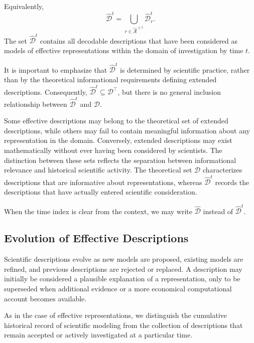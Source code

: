 Equivalently,
\[
\hat{\mathcal{D}}^t = \bigcup_{r\in\hat{\mathcal{R}}^{\leq t}} \hat{\mathcal{D}}_r^t.
\]
The set $\hat{\mathcal{D}}^t$ contains all decodable descriptions that have been considered as models of effective representations within the domain of investigation by time $t$.

It is important to emphasize that $\hat{\mathcal{D}}^t$ is determined by scientific practice, rather than by the theoretical informational requirements defining extended descriptions. Consequently, $\hat{\mathcal{D}}^t\subseteq\mathcal{D}^\top$, but there is no general inclusion relationship between $\hat{\mathcal{D}}^t$ and $\mathcal{D}$.

Some effective descriptions may belong to the theoretical set of extended descriptions, while others may fail to contain meaningful information about any representation in the domain. Conversely, extended descriptions may exist mathematically without ever having been considered by scientists. The distinction between these sets reflects the separation between informational relevance and historical scientific activity. The theoretical set $\mathcal{D}$ characterizes descriptions that are informative about representations, whereas $\hat{\mathcal{D}}^t$ records the descriptions that have actually entered scientific consideration.

\begin{notation}
When the time index is clear from the context, we may write $\hat{\mathcal{D}}$ instead of $\hat{\mathcal{D}}^t$.
\end{notation}


\subsection*{Evolution of Effective Descriptions}

Scientific descriptions evolve as new models are proposed, existing models are refined, and previous descriptions are rejected or replaced. A description may initially be considered a plausible explanation of a representation, only to be superseded when additional evidence or a more economical computational account becomes available.

As in the case of effective representations, we distinguish the cumulative historical record of scientific modeling from the collection of descriptions that remain accepted or actively investigated at a particular time.

